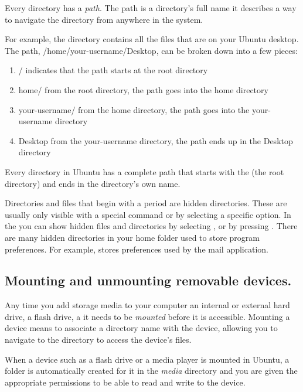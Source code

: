 Every directory has a \emph{path}. The path is a directory's full name \dash it describes a way to navigate the directory from anywhere in the system.

For example, the directory  contains all the files that are on your Ubuntu desktop. The path, /home/your-username/Desktop, can be broken down into a few pieces:

\begin{enumerate}
  \item / \dash indicates that the path starts at the root directory
  \item home/ \dash from the root directory, the path goes into the home directory
  \item your-username/ \dash from the home directory, the path goes into the your-username directory
  \item Desktop \dash from the your-username directory, the path ends up in the Desktop directory
\end{enumerate}

Every directory in Ubuntu has a complete path that starts with the \code{/} (the root directory) and ends in the directory's own name.

Directories and files that begin with a period are hidden directories. These are usually only visible with a special command or by selecting a specific option. In the  you can show hidden files and directories by selecting , or by pressing . There are many hidden directories in your home folder used to store program preferences. For example,  stores preferences used by the  mail application.

\subsection{Mounting and unmounting removable devices.}

Any time you add storage media to your computer \dash an internal or external hard drive, a  flash drive, a  \dash it needs to be \emph{mounted} before it is accessible. Mounting a device means to associate a directory name with the device, allowing you to navigate to the directory to access the device's files.

When a device such as a  flash drive or a media player is mounted in Ubuntu, a folder is automatically created for it in the \emph{media} directory and you are given the appropriate permissions to be able to read and write to the device.

